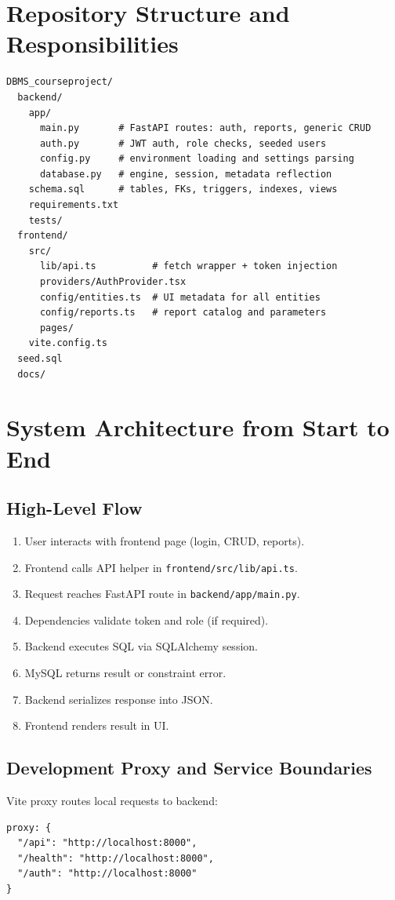 \documentclass[11pt,a4paper]{article}
\begin{document}
\section{Repository Structure and Responsibilities}
\begin{lstlisting}[language={},caption={Project layout at high level}]
DBMS_courseproject/
  backend/
    app/
      main.py       # FastAPI routes: auth, reports, generic CRUD
      auth.py       # JWT auth, role checks, seeded users
      config.py     # environment loading and settings parsing
      database.py   # engine, session, metadata reflection
    schema.sql      # tables, FKs, triggers, indexes, views
    requirements.txt
    tests/
  frontend/
    src/
      lib/api.ts          # fetch wrapper + token injection
      providers/AuthProvider.tsx
      config/entities.ts  # UI metadata for all entities
      config/reports.ts   # report catalog and parameters
      pages/
    vite.config.ts
  seed.sql
  docs/
\end{lstlisting}

\section{System Architecture from Start to End}
\subsection{High-Level Flow}
\begin{enumerate}
  \item User interacts with frontend page (login, CRUD, reports).
  \item Frontend calls API helper in \texttt{frontend/src/lib/api.ts}.
  \item Request reaches FastAPI route in \texttt{backend/app/main.py}.
  \item Dependencies validate token and role (if required).
  \item Backend executes SQL via SQLAlchemy session.
  \item MySQL returns result or constraint error.
  \item Backend serializes response into JSON.
  \item Frontend renders result in UI.
\end{enumerate}

\subsection{Development Proxy and Service Boundaries}
Vite proxy routes local requests to backend:
\begin{lstlisting}[language={},caption={Vite dev proxy}]
proxy: {
  "/api": "http://localhost:8000",
  "/health": "http://localhost:8000",
  "/auth": "http://localhost:8000"
}
\end{lstlisting}
\end{document}
